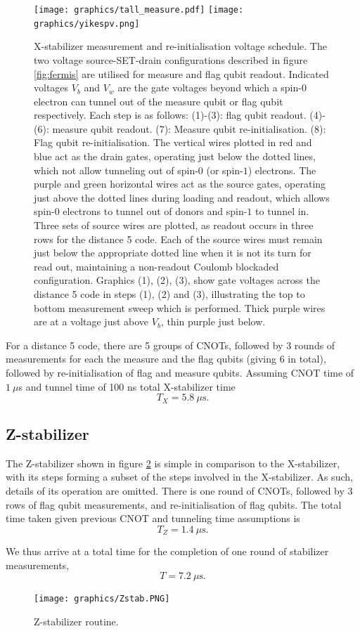 \documentclass[../Thesis.tex]{subfiles}
\begin{document}
\begin{figure}
    \centering
    \texttt{[image: graphics/tall\_measure.pdf]}
    \hspace{-20pt}
    \texttt{[image: graphics/yikespv.png]}
    \caption{X-stabilizer measurement and re-initialisation voltage schedule. The two voltage source-SET-drain configurations described in figure \ref{fig:fermis} are utilised for measure and flag qubit readout. Indicated voltages $V_b$ and $V_w$ are the gate voltages beyond which a spin-$0$ electron can tunnel out of the measure qubit or flag qubit respectively. Each step is as follows:  (1)-(3): flag qubit readout. (4)-(6): measure qubit readout. (7): Measure qubit re-initialisation. (8): Flag qubit re-initialisation. The vertical wires plotted in red and blue act as the drain gates, operating just below the dotted lines, which not allow tunneling out of spin-$0$ (or spin-$1$) electrons. The purple and green horizontal wires act as the source gates, operating just above the dotted lines during loading and readout, which allows spin-$0$ electrons to tunnel out of donors and spin-$1$ to tunnel in. Three sets of source wires are plotted, as readout occurs in three rows for the distance 5 code. Each of the source wires must remain just below the appropriate dotted line when it is not its turn for read out, maintaining a non-readout Coulomb blockaded configuration. Graphics (1), (2), (3), show gate voltages across the distance 5 code in steps (1), (2) and (3), illustrating the top to bottom measurement sweep which is performed. Thick purple wires are at a voltage just above $V_b$, thin purple just below.}
    \label{fig:my_label}
\end{figure}

For a distance 5 code, there are 5 groups of CNOTs, followed by 3 rounds of measurements for each the measure and the flag qubits (giving 6 in total), followed by re-initialisation of flag and measure qubits. Assuming CNOT time of $1\ \mu$s and tunnel time of 100 ns total X-stabilizer time
\begin{equation*}
    T_X = 5.8\ \mu\text{s}.
\end{equation*}

\subsection{Z-stabilizer}
The Z-stabilizer shown in figure \ref{fig:Zstab} is simple in comparison to the X-stabilizer, with its steps forming a subset of the steps involved in the X-stabilizer. As such, details of its operation are omitted. There is one round of CNOTs, followed by 3 rows of flag qubit measurements, and re-initialisation of flag qubits. The total time taken given previous CNOT and tunneling time assumptions is
\begin{equation}
    T_Z = 1.4\ \mu\text{s}.
\end{equation}

We thus arrive at a total time for the completion of one round of stabilizer measurements,
\begin{equation}
    T = 7.2\ \mu\text{s}.
\end{equation}


\begin{figure}
    \centering
    \texttt{[image: graphics/Zstab.PNG]}
    \caption{Z-stabilizer routine.}
    \label{fig:Zstab}
\end{figure}
\end{document}
